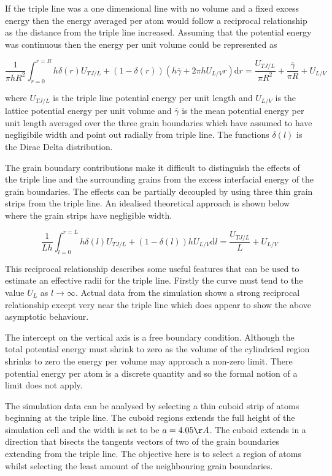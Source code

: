 \documentclass[12pt,a4paper]{book}
\begin{document}
If the triple line was a one dimensional line with no volume and a fixed excess energy then the energy averaged per atom would follow a reciprocal relationship as the distance from the triple line increased. Assuming that the potential energy was continuous then the energy per unit volume could be represented as 

\[ \frac{1}{\pi h R^2}\int_{r=0}^{r=R} h \delta(r) U_{TJ/L} + (1-\delta(r) )\left( h \bar{\gamma} + 2 \pi h U_{L/V} r \right) \text{d}r = \frac{U_{TJ/L}}{\pi R^2} + \frac{\bar{\gamma}}{\pi R} + U_{L/V} \]

where $U_{TJ/L}$ is the triple line potential energy per unit length and $U_{L/V}$ is the lattice potential energy per unit volume and $\bar{\gamma}$ is the mean potential energy per unit length averaged over the three grain boundaries which have assumed to have negligibile width and point out radially from triple line. The functions $\delta(l)$ is the Dirac Delta distribution.

The grain boundary contributions make it difficult to distinguish the effects of the triple line and the surrounding grains from the excess interfacial energy of the grain boundaries. The effects can be partially decoupled by using three thin grain strips from the triple line. An idealised theoretical approach is shown below where the grain strips have negligible width.

\[ \frac{1}{L h}\int_{l=0}^{r=L} h \delta(l) U_{TJ/L} + (1-\delta(l) ) h U_{L/V}  \text{d}l = \frac{U_{TJ/L}}{L}  + U_{L/V} 
\label{eq:L1}
\]


This reciprocal relationship describes some useful features that can be used to estimate an effective radii for the triple line. Firstly the curve must tend to the value $U_L$ as $l \rightarrow \infty$. Actual data from the simulation shows a strong reciprocal relationship except very near the triple line which does appear to show the above asymptotic behaviour. 

The intercept on the vertical axis is a free boundary condition. Although the total potential energy must shrink to zero as the volume of the cylindrical region shrinks to zero the energy per volume may approach a non-zero limit. There potential energy per atom is a discrete quantity and so the formal notion of a limit does not apply. 


The simulation data can be analysed by selecting a thin cuboid strip of atoms beginning at the triple line. The cuboid regions extends the full height of the simulation cell and the width is set to be $a =4.05 \AA$. The cuboid extends in a direction that bisects the tangents vectors of two of the grain boundaries extending from the triple line. The objective here is to select a region of atoms whilst selecting the least amount of the neighbouring grain boundaries. 
\end{document}
